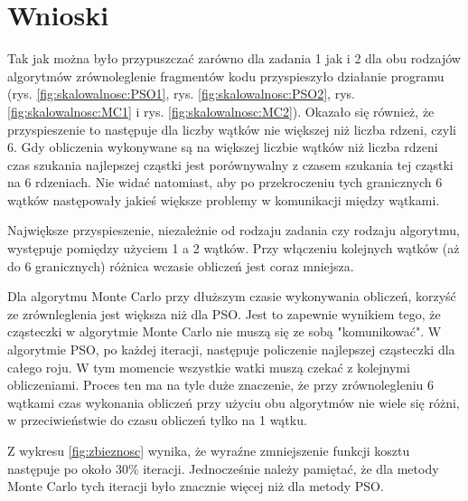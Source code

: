 \documentclass[11pt, a4paper, oneside]{article}
\begin{document}
\section{Wnioski} 

Tak jak można było przypuszczać zarówno dla zadania 1 jak i 2 dla obu rodzajów algorytmów zrównoleglenie fragmentów kodu przyspieszyło działanie programu (rys. \ref{fig:skalowalnosc:PSO1}, rys. \ref{fig:skalowalnosc:PSO2}, rys. \ref{fig:skalowalnosc:MC1} i rys. \ref{fig:skalowalnosc:MC2}). Okazało się również, że przyspieszenie to następuje dla liczby wątków nie większej niż liczba rdzeni, czyli 6. Gdy obliczenia wykonywane są na większej liczbie wątków niż liczba rdzeni czas szukania najlepszej cząstki jest porównywalny z czasem szukania tej cząstki na 6 rdzeniach. Nie widać natomiast, aby po przekroczeniu tych granicznych 6 wątków następowały jakieś większe problemy w komunikacji między wątkami.

Największe przyspieszenie, niezależnie od rodzaju zadania czy rodzaju algorytmu, występuje pomiędzy użyciem 1 a 2 wątków. Przy włączeniu kolejnych wątków (aż do 6 granicznych) różnica wczasie obliczeń jest coraz mniejsza.

Dla algorytmu Monte Carlo przy dłuższym czasie wykonywania obliczeń, korzyść ze zrównleglenia jest większa niż dla PSO. Jest to zapewnie wynikiem tego, że cząsteczki w algorytmie Monte Carlo nie muszą się ze sobą "komunikować". W algorytmie PSO, po każdej iteracji, następuje policzenie najlepszej cząsteczki dla całego roju. W tym momencie wszystkie watki muszą czekać z kolejnymi obliczeniami. Proces ten ma na tyle duże znaczenie, że przy zrównolegleniu 6 wątkami czas wykonania obliczeń przy użyciu obu algorytmów nie wiele się różni, w przeciwieństwie do czasu obliczeń tylko na 1 wątku.

Z wykresu \ref{fig:zbieznosc} wynika, że wyraźne zmniejszenie funkcji kosztu następuje po około 30\% iteracji. Jednocześnie należy pamiętać, że dla metody Monte Carlo tych iteracji było znacznie więcej niż dla metody PSO.


{}

\end{document}
